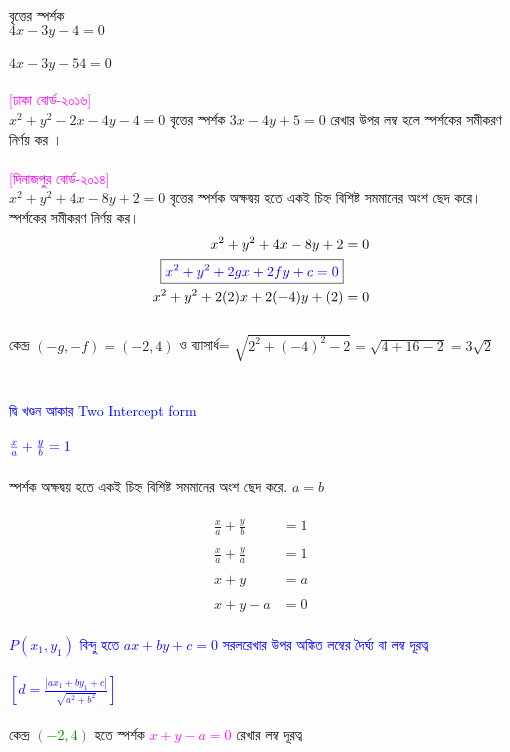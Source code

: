 \documentclass{article}
\begin{document}
\\
বৃত্তের স্পর্শক \\ 
$4x-3y-4=0$\\
\\
$4x-3y-54=0$\\
\\
\textcolor{magenta}{[ঢাকা বোর্ড-২০১৬]}\\ 
$x^2+y^2-2x-4y-4=0$ বৃত্তের স্পর্শক  $3x-4y+5=0$ রেখার উপর লম্ব হলে স্পর্শকের সমীকরণ নির্ণয় কর ।  \\ 
\\ 
\textcolor{magenta}{[দিনাজপুর বোর্ড-২০১৪]}\\ 
$x^2+y^2+4x-8y+2=0$ বৃত্তের স্পর্শক অক্ষদ্বয় হতে একই চিহ্ন বিশিষ্ট সমমানের অংশ ছেদ করে। স্পর্শকের সমীকরণ নির্ণয় কর।   \\
	\begin{align*}
	x^2+y^2+4x-8y+2&=0\\
	\boxed{\textcolor{blue}{x^2+y^2+2gx+2fy+c=0}}&\\
	x^2+y^2+2(2)x+2(-4)y+(2)&=0
\end{align*}
\\
কেন্দ্র 	$(-g,-f)=(-2,4)$ ও ব্যাসার্ধ= $\sqrt{2^2+(-4)^2-2}=\sqrt{4+16-2}=3\sqrt{2}$\\
\\  
	\\
\textcolor{blue}{ দ্বি খণ্ডন আকার  Two	Intercept form}\\
\\
$\textcolor{blue}{\frac{x}{a}+\frac{y}{b}=1}$\\
\\
স্পর্শক অক্ষদ্বয় হতে একই চিহ্ন বিশিষ্ট সমমানের অংশ ছেদ করে. $a=b$\\
\\
\begin{align*}
\frac{x}{a}+\frac{y}{b}&=1\\
\\
\frac{x}{a}+\frac{y}{a}&=1\\
\\
x+y&=a\\
\\
x+y-a&=0
\end{align*}
\\  
\textcolor{blue}{$P(x_1,y_1)$ বিন্দু হতে  $ax+by+c=0$ সরলরেখার উপর অঙ্কিত লম্বের দৈর্ঘ্য বা লম্ব দূরত্ব \\
	\\
	$\left[d=\frac{|ax_1+by_1+c|}{\sqrt{a^2+b^2}}\right]$}\\
\\
কেন্দ্র \textcolor{green}{$(-2,4)$} হতে স্পর্শক \textcolor{magenta}{$x+y-a=0$}  রেখার লম্ব দূরত্ব \\
\end{document}
